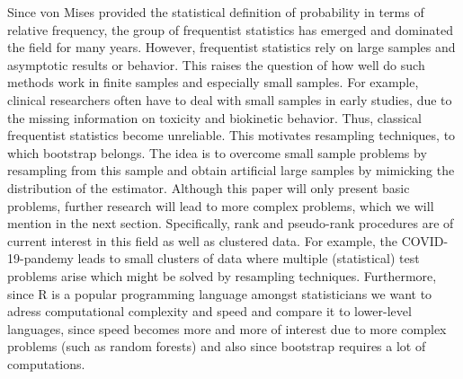 Since von Mises provided the statistical definition of probability in terms of relative frequency, the group of frequentist statistics has emerged and dominated the field for many years. However, frequentist statistics rely on large samples and asymptotic results or behavior. This raises the question of how well do such methods work in finite samples and especially small samples. For example, clinical researchers often have to deal with small samples in early studies, due to the missing information on toxicity and biokinetic behavior. Thus, classical frequentist statistics become unreliable. This motivates resampling techniques, to which bootstrap belongs. The idea is to overcome small sample problems by resampling from this sample and obtain artificial large samples by mimicking the distribution of the estimator. Although this paper will only present basic problems, further research will lead to more complex problems, which we will mention in the next section. Specifically, rank and pseudo-rank procedures are of current interest in this field as well as clustered data. For example, the COVID-19-pandemy leads to small clusters of data where multiple (statistical) test problems arise which might be solved by resampling techniques. Furthermore, since R is a popular programming language amongst statisticians we want to adress computational complexity and speed and compare it to lower-level languages, since speed becomes more and more of interest due to more complex problems (such as random forests) and also since bootstrap requires a lot of computations.